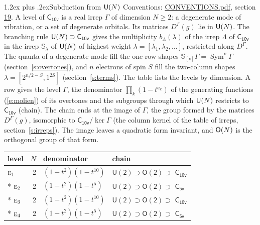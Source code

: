 \documentclass[10pt,a4paper]{article}
\makeatletter
\renewcommand\section{\@startsection{section}{1}{\z@}{-3ex plus -1ex minus -.2ex}%
  {1.2ex plus .2ex}{\normalfont\large\sffamily\bfseries\color{parttitle}}}
\numberwithin{equation}{section}
\newcommand{\grp}[1]{\mathsf{#1}}
\newcommand{\irr}[1]{\text{\normalfont\scshape #1}}
\newcommand{\repD}[1]{D^{#1}}
\newcommand{\schur}[1]{\mathbb{S}_{#1}}
\newcommand{\shape}[1]{[#1]}
\makeatother
\begin{document}
\section{Subduction from \texorpdfstring{$\grp{U(\mathnormal{N})}$}{U(N)}}\label{s:unitary}
Conventions: \href{../../CONVENTIONS.pdf}{CONVENTIONS.pdf}, section \href{../../CONVENTIONS.pdf\#conv.19}{19}.
\leavevmode\label{n:local.level.dimension}A level of $\grp{C_{10v}}$ is a real irrep $\Gamma$ of dimension $N \ge 2$: a degenerate mode of vibration, or a set of degenerate orbitals. \label{n:group.unitary}Its matrices $\repD{\Gamma}(g)$ lie in $\grp{U(\mathnormal{N})}$. \label{n:irrep.schur}\label{n:shape.partition}\label{n:local.partition}\label{n:function.multiplicity.unitary}The branching rule $\grp{U(\mathnormal{N})} \supset \grp{C_{10v}}$ gives the multiplicity $b_\Lambda(\lambda)$ of the irrep $\Lambda$ of $\grp{C_{10v}}$ in the irrep $\schur{\lambda}$ of $\grp{U(\mathnormal{N})}$ of highest weight $\lambda = \shape{\lambda_1, \lambda_2, \dots}$, restricted along $\repD{\Gamma}$. \label{n:local.partition.power}\label{n:local.electrons}\label{n:local.spin}The quanta of a degenerate mode fill the one-row shapes $\schur{\shape{v}}\Gamma = \operatorname{Sym}^{v}\Gamma$ (section~\ref{s:overtones}), and $n$ electrons of spin $S$ fill the two-column shapes $\lambda = \shape{2^{n/2-S}, 1^{2S}}$ (section~\ref{s:terms}).
The table lists the levels by dimension. \label{n:head.level}\label{n:head.denominator}\label{n:index.overtone.denominator}\label{n:head.chain}A row gives the level $\Gamma$, the denominator $\prod_k (1 - t^{a_k})$ of the generating functions (\ref{e:molien}) of its overtones and the subgroups through which $\grp{U(\mathnormal{N})}$ restricts to $\grp{C_{10v}}$ (chain). The chain ends at the image of $\Gamma$, the group formed by the matrices $\repD{\Gamma}(g)$, isomorphic to $\grp{C_{10v}}/\ker\Gamma$ (the column kernel of the table of irreps, section~\ref{s:irreps}). The image leaves a quadratic form invariant, and $\grp{O(\mathnormal{N})}$ is the orthogonal group of that form.
{\small\begin{longtable}{@{}lrll@{}}\toprule
level & $N$ & denominator & chain\\\midrule\endhead
\bottomrule\endfoot\endlastfoot
$\irr{e}_{1}$ & 2 & $(1-t^{2})(1-t^{10})$ & $\grp{U(2)} \supset \grp{O(2)} \supset$ \href{C10v.pdf}{$\grp{C_{10v}}$}\\*
$\irr{e}_{2}$ & 2 & $(1-t^{2})(1-t^{5})$ & $\grp{U(2)} \supset \grp{O(2)} \supset$ \href{C5v.pdf}{$\grp{C_{5v}}$}\\*
$\irr{e}_{3}$ & 2 & $(1-t^{2})(1-t^{10})$ & $\grp{U(2)} \supset \grp{O(2)} \supset$ \href{C10v.pdf}{$\grp{C_{10v}}$}\\*
$\irr{e}_{4}$ & 2 & $(1-t^{2})(1-t^{5})$ & $\grp{U(2)} \supset \grp{O(2)} \supset$ \href{C5v.pdf}{$\grp{C_{5v}}$}\\
\bottomrule\end{longtable}}
\end{document}
